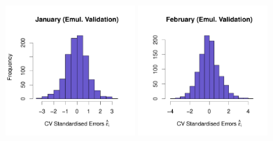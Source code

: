 \documentclass[a4paper, 12pt]{article}
\begin{document}
\renewcommand{\scale}{13.2em}
\begin{figure}
\centering
 \includegraphics[width=\scale]{Emulator_CV/Histograms/January_CV_Errors_Hist}\hspace{-3ex}
 \includegraphics[width=\scale]{Emulator_CV/Histograms/February_CV_Errors_Hist}\hspace{-3ex}

\end{figure}
\end{document}
